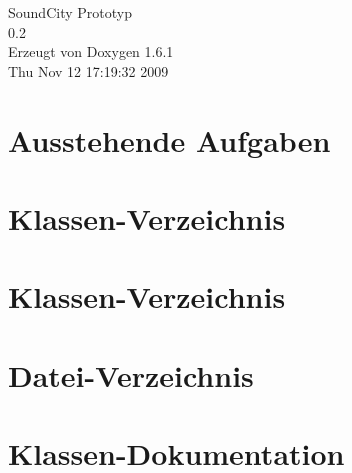\documentclass[a4paper]{article}
\begin{document}
\hypersetup{pageanchor=false}
\begin{titlepage}
\vspace*{7cm}
\begin{center}
{\Large SoundCity Prototyp \\[1ex]\large 0.2 }\\
\vspace*{1cm}
{\large Erzeugt von Doxygen 1.6.1}\\
\vspace*{0.5cm}
{\small Thu Nov 12 17:19:32 2009}\\
\end{center}
\end{titlepage}
\tableofcontents
{}
\hypersetup{pageanchor=true}
\section{Ausstehende Aufgaben}
\label{todo}
\hypertarget{todo}{}

\section{Klassen-\/Verzeichnis}

\section{Klassen-\/Verzeichnis}

\section{Datei-\/Verzeichnis}

\section{Klassen-\/Dokumentation}


































\end{document}
